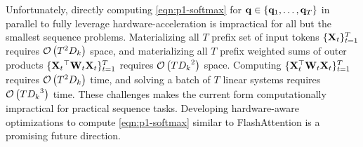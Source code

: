\documentclass[notitlepage, 11pt]{article}
\newcommand*{\dkey}{{D_k}}
\begin{document}
Unfortunately, directly computing \autoref{eqn:p1-softmax} for $\mathbf{q}\in \{\mathbf{q}_1, \ldots, \mathbf{q}_T\}$ in parallel to fully leverage hardware-acceleration is impractical for all but the smallest sequence problems.
Materializing all $T$ prefix set of input tokens $\{\mathbf{X}_t\}_{t=1}^T$ requires $\bigo{T^2\dkey}$ space, and materializing all $T$ prefix weighted sums of outer products $\{\mathbf{X}_t{}^\top\mathbf{W}_t\mathbf{X}_t\}_{t=1}^T$ requires $\bigo{T\dkey^2}$ space.
Computing $\{\mathbf{X}{}^\top_t\mathbf{W}_t \allowbreak \mathbf{X}_t\}_{t=1}^T$ requires $\bigo{T^2\dkey}$ time, and solving a batch of $T$ linear systems requires $\bigo{T\dkey^3}$ time.
These challenges makes the current form computationally impractical for practical sequence tasks.
Developing hardware-aware optimizations to compute \autoref{eqn:p1-softmax} similar to FlashAttention \citep{Dao2022FlashAttentionFastMemoryEfficient} is a promising future direction.
\end{document}
